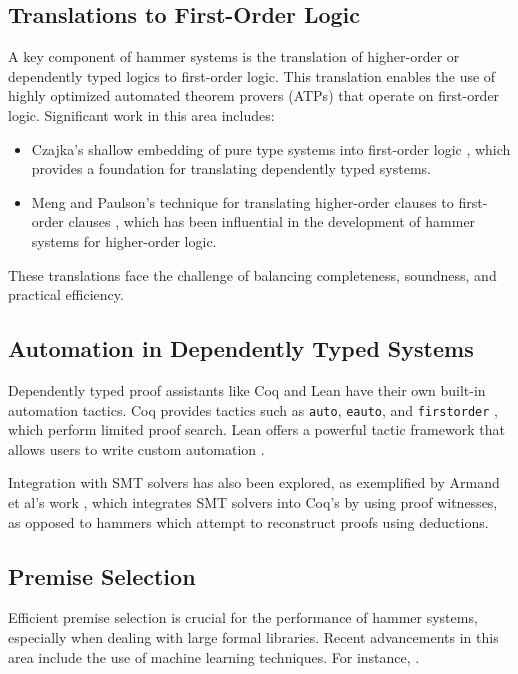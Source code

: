 \subsection{Translations to First-Order Logic}

A key component of hammer systems is the translation of higher-order or dependently typed logics to first-order logic. This translation enables the use of highly optimized automated theorem provers (ATPs) that operate on first-order logic. Significant work in this area includes:

\begin{itemize}
    \item Czajka's shallow embedding of pure type systems into first-order logic \cite{czajka2018shallow}, which provides a foundation for translating dependently typed systems.
    \item Meng and Paulson's technique for translating higher-order clauses to first-order clauses \cite{meng2008translating}, which has been influential in the development of hammer systems for higher-order logic.
\end{itemize}

These translations face the challenge of balancing completeness, soundness, and practical efficiency.

\subsection{Automation in Dependently Typed Systems}

Dependently typed proof assistants like Coq and Lean have their own built-in automation tactics. Coq provides tactics such as \texttt{auto}, \texttt{eauto}, and \texttt{firstorder} \cite{Coq:manual}, which perform limited proof search. Lean offers a powerful tactic framework that allows users to write custom automation \cite{lean}.

Integration with SMT solvers has also been explored, as exemplified by Armand et al's work \cite{armand2011modular}, which integrates SMT solvers into Coq's by using proof witnesses, as opposed to hammers which attempt to reconstruct proofs using deductions.

\subsection{Premise Selection}

Efficient premise selection is crucial for the performance of hammer systems, especially when dealing with large formal libraries. Recent advancements in this area include the use of machine learning techniques. For instance, .

